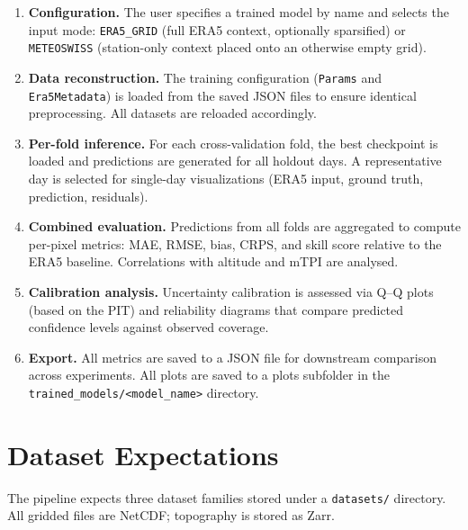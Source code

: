 \begin{enumerate}
  \item \textbf{Configuration.} The user specifies a trained model by name and selects the input mode: \texttt{ERA5\_GRID} (full ERA5 context, optionally sparsified) or \texttt{METEOSWISS} (station-only context placed onto an otherwise empty grid).

  \item \textbf{Data reconstruction.} The training configuration (\texttt{Params} and \texttt{Era5Metadata}) is loaded from the saved JSON files to ensure identical preprocessing. All datasets are reloaded accordingly.

  \item \textbf{Per-fold inference.} For each cross-validation fold, the best checkpoint is loaded and predictions are generated for all holdout days. A representative day is selected for single-day visualizations (ERA5 input, ground truth, prediction, residuals).

  \item \textbf{Combined evaluation.} Predictions from all folds are aggregated to compute per-pixel metrics: MAE, RMSE, bias, CRPS, and skill score relative to the ERA5 baseline.
  Correlations with altitude and mTPI are analysed.

  \item \textbf{Calibration analysis.} Uncertainty calibration is assessed via Q--Q plots (based on the PIT) and reliability diagrams that compare predicted confidence levels against observed coverage.

  \item \textbf{Export.} All metrics are saved to a JSON file for downstream comparison across experiments. All plots are saved to a plots subfolder in the \texttt{trained\_models/<model\_name>} directory.
\end{enumerate}

\section{Dataset Expectations}
\label{sec:dataset-expectations}

The pipeline expects three dataset families stored under a \texttt{datasets/} directory.
All gridded files are NetCDF; topography is stored as Zarr.


